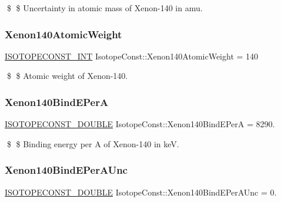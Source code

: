 \$ \$ Uncertainty in atomic mass of Xenon-\/140 in amu. \mbox{\label{group___isotope_const-_xenon-_xe140_ga1a26bba7aee31703295db30b7c418f46}} 
\subsubsection{\texorpdfstring{Xenon140\+Atomic\+Weight}{Xenon140AtomicWeight}}
{\footnotesize\ttfamily \mbox{\hyperlink{group___isotope_const-_macros_ga5f18360b3e99483a35c32d789e62621c}{I\+S\+O\+T\+O\+P\+E\+C\+O\+N\+S\+T\+\_\+\+I\+NT}} Isotope\+Const\+::\+Xenon140\+Atomic\+Weight = 140}

\$ \$ Atomic weight of Xenon-\/140. \mbox{\label{group___isotope_const-_xenon-_xe140_ga1b74533b85357e2cb9f912bdf1f083fa}} 
\subsubsection{\texorpdfstring{Xenon140\+Bind\+E\+PerA}{Xenon140BindEPerA}}
{\footnotesize\ttfamily \mbox{\hyperlink{group___isotope_const-_macros_ga8f45a7272ce02c0b4c65c44636ed719a}{I\+S\+O\+T\+O\+P\+E\+C\+O\+N\+S\+T\+\_\+\+D\+O\+U\+B\+LE}} Isotope\+Const\+::\+Xenon140\+Bind\+E\+PerA = 8290.}

\$ \$ Binding energy per A of Xenon-\/140 in keV. \mbox{\label{group___isotope_const-_xenon-_xe140_gafa027be2cea04a6d4559fdf0c836723e}} 
\subsubsection{\texorpdfstring{Xenon140\+Bind\+E\+Per\+A\+Unc}{Xenon140BindEPerAUnc}}
{\footnotesize\ttfamily \mbox{\hyperlink{group___isotope_const-_macros_ga8f45a7272ce02c0b4c65c44636ed719a}{I\+S\+O\+T\+O\+P\+E\+C\+O\+N\+S\+T\+\_\+\+D\+O\+U\+B\+LE}} Isotope\+Const\+::\+Xenon140\+Bind\+E\+Per\+A\+Unc = 0.}

